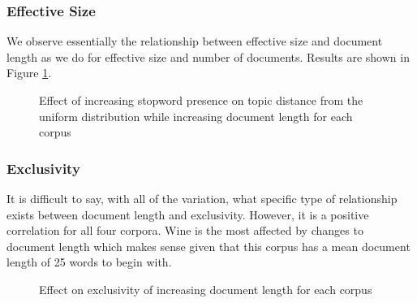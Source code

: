 \documentclass[letterpaper, 10 pt, conference]{ieeeconf}  %
\begin{document}
\subsubsection{Effective Size}
We observe essentially the relationship between effective size and document length as we do for effective size and number of documents. Results are shown in Figure \ref{fig:dl_eff_size}.
  \begin{figure}[thpb]
      \centering
      \caption{Effect of increasing stopword presence on topic distance from the uniform distribution while increasing document length for each corpus}
      \label{fig:dl_eff_size}
   \end{figure}

\subsubsection{Exclusivity}
It is difficult to say, with all of the variation, what specific type of relationship exists between document length and exclusivity. However, it is a positive correlation for all four corpora. Wine is the most affected by changes to document length which makes sense given that this corpus has a mean document length of 25 words to begin with.

\begin{figure}[thpb]
      \centering
      \caption{Effect on exclusivity of increasing document length for each corpus}
      \label{fig:dl_exclusivity}
   \end{figure}
\end{document}
